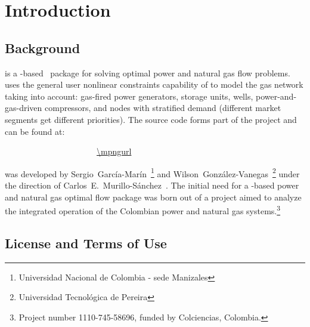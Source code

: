\normalsize
{}
\setcounter{page}{1}

\chapter{Introduction}

\section{Background}

\mpng{} is a \matpower{}-based~\cite{zimmerman2011,matpower} package for solving optimal power and natural gas flow problems. \mpng{} uses the general user nonlinear constraints capability of \matpower{} to model the gas network taking into account: gas-fired power generators, storage units, wells, power-and-gas-driven compressors, and nodes with stratified demand (different market segments get different priorities). The \mpng{} source code forms part of the \matpower{} project and can be found at:

\bigskip
~~~~~~~~~~~~~~~~~~~~~~\url{\mpngurl}
\bigskip

\noindent \mpng{} was developed by Sergio~García-Marín~\footnote[1]{{\tiny Universidad Nacional de Colombia - sede Manizales\label{foot:UNAL}}} and Wilson~González-Vanegas~\footnote[2]{{\tiny Universidad Tecnológica de Pereira\label{foot:UTP}}} under the direction of Carlos~E.~Murillo-S\'anchez~. The initial need for a \matpower{}-based power and natural gas optimal flow package was born out of a project aimed to analyze the integrated operation of the Colombian power and natural gas systems.\footnote[3]{{\tiny Project number 1110-745-58696, funded by Colciencias, Colombia.}}

\section{License and Terms of Use}

